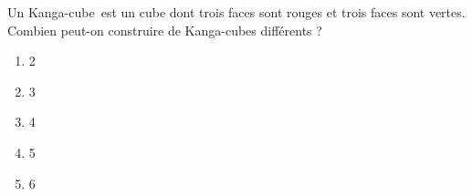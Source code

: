 Un \og Kanga-cube\fg\ est un cube dont trois faces sont rouges et trois faces sont vertes. Combien peut-on construire de Kanga-cubes différents ?
\begin{multicols}{5}
  \begin{enumerate}[A/]
  \item 2
  \item 3
  \item 4
  \item 5
  \item 6
  \end{enumerate}
\end{multicols}